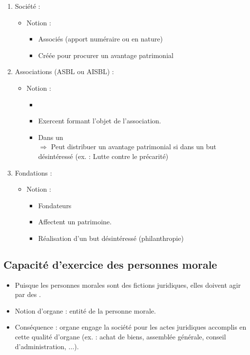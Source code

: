 \begin{enumerate}
    \item Société :
    \begin{itemize}
        \item Notion :
        \begin{itemize}
            \item Associés (apport numéraire ou en nature)
            \item Créée pour procurer un avantage patrimonial
        \end{itemize}
    \end{itemize}
    \item Associations (ASBL ou AISBL) :
    \begin{itemize}
        \item Notion :
        \begin{itemize}
            \item {}
            \item Exercent  formant l'objet de l'association.
            \item Dans un \\
            $\Rightarrow$ Peut distribuer un avantage patrimonial si dans un but désintéressé (ex. : Lutte contre le précarité)
        \end{itemize}
    \end{itemize}
    \medskip
    \item Fondations :
    \begin{itemize}
        \item Notion :
        \begin{itemize}
            \item Fondateurs
            \item Affectent un patrimoine.
            \item Réalisation d'un but désintéressé (philanthropie)
        \end{itemize}
    \end{itemize}
\end{enumerate}

\subsection{Capacité d'exercice des personnes morale}

\begin{itemize}
    \item Puisque les personnes morales sont des fictions juridiques, elles doivent agir par des .
    \item Notion d'organe : entité  de la personne morale.
    \item Conséquence : organe engage la société pour les actes juridiques accomplis en cette qualité d'organe (ex. :  achat de biens, assemblée générale, conseil d'administration, ...).
\end{itemize}

